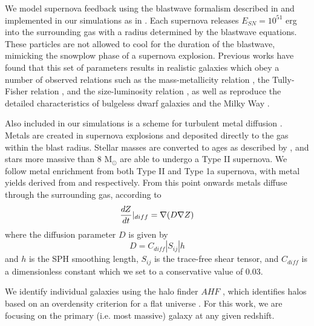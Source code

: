 \documentclass[nofootinbib,twocolumn,prd]{emulateapj}
\begin{document}
We model supernova feedback using the
blastwave formalism described in \citet{McKee77} and implemented in
our simulations as in \citet{Stinson06}.  Each supernova releases
$E_{SN} = 10^{51}$ erg into the surrounding gas with a radius
determined by the blastwave equations.  These particles are not
allowed to cool for the duration of the blastwave, mimicking the
snowplow phase of a supernova explosion.  Previous works have found
that this set of parameters results in realistic galaxies which obey a
number of observed relations such as the mass-metallicity relation
\citep{Brooks07,Kirby13}, the Tully-Fisher relation \citep{Governato09}, and
the size-luminosity relation \citep{Brooks11}, as well as reproduce
the detailed characteristics of bulgeless dwarf galaxies
\citep{Governato10} and the Milky Way \citep{Guedes11}.


Also included in our simulations is a scheme for turbulent metal
diffusion \citep{Shen10}.  Metals are created in supernova explosions
and deposited directly to the gas within the blast radius.  Stellar
masses are converted to ages as described by \citet{Raiteri96}, and
stars more massive than 8 M$_\odot$ are able to undergo a Type II
supernova.  We follow metal enrichment from both Type II and Type 1a
supernova, with metal yields derived from \citet{Weaver93} and
\citet{Thielemann86} respectively.  From this point onwards metals
diffuse through the surrounding gas, according to 
\begin{equation}
\frac{dZ}{dt}|_{diff} = \nabla (D \nabla {Z}) \\
\end{equation}
%
where the diffusion parameter $D$ is given by
%
\begin{equation}
D = C_{diff} |S_{ij}| h
\end{equation}
%
and $h$ is the SPH smoothing length, $S_{ij}$ is the trace-free shear
tensor, and $C_{diff}$ is a dimensionless constant which we set to a conservative value of 0.03.  


We identify individual galaxies using the halo finder $AHF$
\citep{Gill04,Knollmann09}, which identifies halos based on an
overdensity criterion for a flat universe \citep{Gross97}.  For this
work, we are focusing on the primary (i.e. most massive) galaxy at any
given redshift.%
\end{document}
